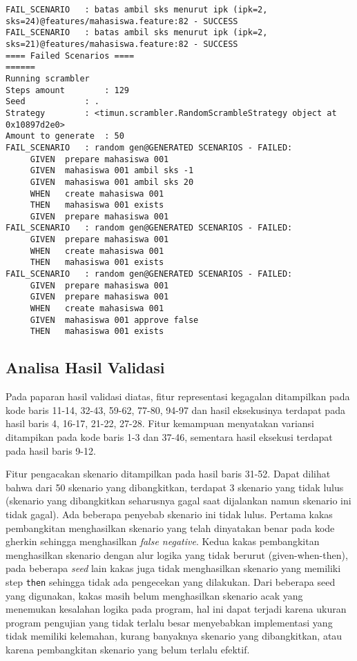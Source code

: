 \begin{lstlisting}[language=testresult]
FAIL_SCENARIO	: batas ambil sks menurut ipk (ipk=2, sks=24)@features/mahasiswa.feature:82 - SUCCESS
FAIL_SCENARIO	: batas ambil sks menurut ipk (ipk=2, sks=21)@features/mahasiswa.feature:82 - SUCCESS
==== Failed Scenarios ====
======
Running scrambler
Steps amount		: 129
Seed			: .
Strategy		: <timun.scrambler.RandomScrambleStrategy object at 0x10897d2e0>
Amount to generate	: 50
FAIL_SCENARIO	: random gen@GENERATED SCENARIOS - FAILED:
	 GIVEN	prepare mahasiswa 001
	 GIVEN	mahasiswa 001 ambil sks -1
	 GIVEN	mahasiswa 001 ambil sks 20
	 WHEN	create mahasiswa 001
	 THEN	mahasiswa 001 exists
	 GIVEN	prepare mahasiswa 001
FAIL_SCENARIO	: random gen@GENERATED SCENARIOS - FAILED:
	 GIVEN	prepare mahasiswa 001
	 WHEN	create mahasiswa 001
	 THEN	mahasiswa 001 exists
FAIL_SCENARIO	: random gen@GENERATED SCENARIOS - FAILED:
	 GIVEN	prepare mahasiswa 001
	 GIVEN	prepare mahasiswa 001
	 WHEN	create mahasiswa 001
	 GIVEN	mahasiswa 001 approve false
	 THEN	mahasiswa 001 exists
\end{lstlisting}


\subsection{Analisa Hasil Validasi}

Pada paparan hasil validasi diatas, fitur representasi kegagalan ditampilkan pada kode baris 11-14,
32-43, 59-62, 77-80, 94-97 dan hasil eksekusinya terdapat pada hasil baris 4, 16-17, 21-22, 27-28.
Fitur kemampuan menyatakan variansi ditampikan pada kode baris 1-3 dan 37-46, sementara hasil eksekusi
terdapat pada hasil baris 9-12.

Fitur pengacakan skenario ditampilkan pada hasil baris 31-52. Dapat dilihat bahwa dari 50 skenario yang dibangkitkan,
terdapat 3 skenario yang tidak lulus (skenario yang dibangkitkan seharusnya gagal saat dijalankan namun skenario ini tidak gagal).
Ada beberapa penyebab skenario ini tidak lulus.
Pertama kakas pembangkitan menghasilkan skenario yang telah dinyatakan benar pada kode gherkin sehingga menghasilkan \textit{false negative}.
Kedua kakas pembangkitan menghasilkan skenario dengan alur logika yang tidak berurut (given-when-then), pada beberapa \textit{seed}
lain kakas juga tidak menghasilkan skenario yang memiliki step \texttt{then} sehingga tidak ada pengecekan yang dilakukan.
Dari beberapa seed yang digunakan, kakas masih belum menghasilkan skenario acak yang menemukan kesalahan logika pada program,
hal ini dapat terjadi karena ukuran program pengujian yang tidak terlalu besar menyebabkan implementasi yang tidak memiliki kelemahan,
kurang banyaknya skenario yang dibangkitkan, atau karena pembangkitan skenario yang belum terlalu efektif.

